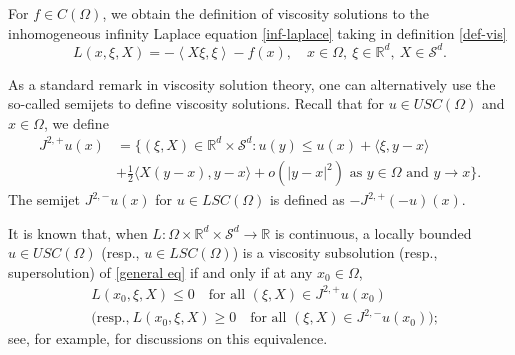\documentclass[12pt, reqno]{amsart}
\newtheorem{definition}{Definition}%
\newcommand{\R}{\mathbb{R}}
\def\Om{\Omega}
\def\R{{\mathbb R}}
\def\F{{\mathcal F}}
\def\S{{\mathcal S}}
\begin{document}
For $f\in C(\Omega)$, we obtain the definition of viscosity solutions to the inhomogeneous infinity Laplace equation \eqref{inf-laplace} taking in definition \ref{def-vis}
\[
L(x, \xi, X)=-\left\langle X \xi, \xi\right\rangle-f(x), \quad x\in \Omega,\  \xi \in \R^d,\ X\in \S^d. 
\]

As a standard remark in viscosity solution theory, one can alternatively use the so-called semijets to define viscosity solutions. Recall that for $u\in USC(\Om)$ and $x\in \Om$, we define 
\[
\begin{aligned}
J^{2, +}u(x)&=\bigg\{(\xi, X)\in \R^{d}\times \S^d: 
u(y)\le u(x) +\langle \xi, y-x\rangle\\
&+ \frac{1}{2}\langle X(y-x), y-x\rangle+o(|y-x|^2)\text{ as $y\in \Om$ and $y\to x$}\bigg\}.
\end{aligned}
\]
The semijet $J^{2, -}u(x)$ for $u\in LSC(\Om)$ is defined as $-J^{2, +}(-u)(x)$. 

It is known that, when $L: \Om\times \R^d\times \S^d\to \R$ is continuous, a locally bounded $u\in USC(\Om)$ (resp., $u\in LSC(\Om)$) is a viscosity subsolution (resp., supersolution) of \eqref{general eq} if and only if at any $x_0\in \Om$,
\[
\begin{aligned}
&L(x_0, \xi, X)\leq 0\quad \text{for all $(\xi, X)\in J^{2, +}u(x_0)$}\\
&\big(\text{resp.,} \ L(x_0, \xi, X)\geq 0\quad \text{for all $(\xi, X)\in J^{2, -}u(x_0)$}
\big);
\end{aligned}
\]
see, for example, \cite[Remark 2.3, Remark 8.1]{CIL} for discussions on this equivalence. %
\end{document}
